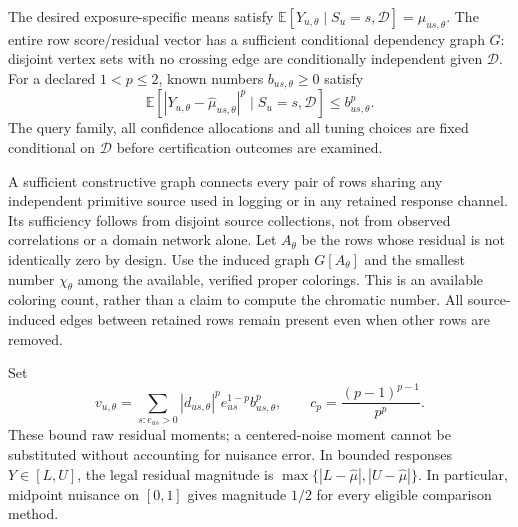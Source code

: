 \begin{assumption}
\label{ass:post-core}
The desired exposure-specific means satisfy
$\mathbb E[Y_{u,\theta}\mid S_u=s,\mathcal D]=\mu_{us,\theta}$.
The entire row score/residual vector has a sufficient conditional dependency
graph $G$: disjoint vertex sets with no crossing edge are conditionally
independent given $\mathcal D$. For a declared $1<p\leq2$, known numbers
$b_{us,\theta}\geq0$ satisfy
\begin{equation}
 \mathbb E\!\left[
 |Y_{u,\theta}-\widehat\mu_{us,\theta}|^p
 \mid S_u=s,\mathcal D\right]\leq b_{us,\theta}^p.
 \label{eq:post-channel-envelope}
\end{equation}
The query family, all confidence allocations and all tuning choices are fixed
conditional on $\mathcal D$ before certification outcomes are examined.
\end{assumption}

A sufficient constructive graph connects every pair of rows sharing any
independent primitive source used in logging or in any retained response
channel. Its sufficiency follows from disjoint source collections, not from
observed correlations or a domain network alone. Let $A_\theta$ be the rows
whose residual is not identically zero by design. Use the induced graph
$G[A_\theta]$ and the smallest number $\chi_\theta$ among the available,
verified proper colorings. This is an available coloring count, rather than
a claim to compute the chromatic number. All source-induced edges between
retained rows remain present even when other rows are removed.

Set
\begin{equation}
 v_{u,\theta}
 =\sum_{s:e_{us}>0}|d_{us,\theta}|^p e_{us}^{1-p}b_{us,\theta}^p,
 \qquad
 c_p=\frac{(p-1)^{p-1}}{p^p}.
 \label{eq:post-v}
\end{equation}
These bound raw residual moments; a centered-noise moment cannot be substituted
without accounting for nuisance error. In bounded responses $Y\in[L,U]$, the
legal residual magnitude is $\max\{|L-\widehat\mu|,|U-\widehat\mu|\}$.
In particular, midpoint nuisance on $[0,1]$ gives magnitude $1/2$ for every
eligible comparison method.

